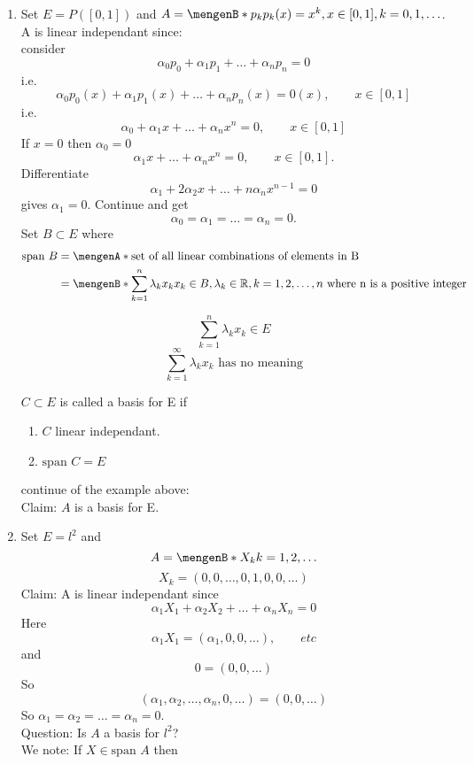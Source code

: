 	\begin{beispiele}
		\begin{enumerate}[(1)]
			\item 
		Set $E = P([0,1])$ and $A = \set[p_k]{p_k(x) = x^k, x \in [0,1], k= 0,1, \dots}$. A is linear independant since: \\ consider
		\[
			\alpha_0 p_0 + \alpha_1 p_1 + \dots + \alpha_np_n = 0
		\]
		i.e. 
		\[
			\alpha_0 p_0(x) + \alpha_1 p_1(x) + \dots + \alpha_n p_n(x) = 0(x), \qquad x \in [0,1] 
		\]
		i.e.
		\[
			\alpha_0 + \alpha_1 x + \dots + \alpha_n x^n = 0, \qquad x \in [0,1]
		\]
		If $x = 0$ then $\alpha_0 = 0$
		\[
			\alpha_1 x + \dots + \alpha_n x^n = 0, \qquad x \in [0,1].
		\]
		Differentiate
		\[
			\alpha_1 + 2 \alpha_2 x + \dots + n \alpha_n x^{n-1} = 0
		\]
		gives $\alpha_1 = 0$. Continue and get
		\[
			\alpha_0 = \alpha_1 = \dots = \alpha_n = 0.
		\]
		Set $B \subset E$ where
		\begin{align*}
			\text{span } B &= \set{\text{set of all linear combinations of elements in B}} \\
			&= \set[\sum_{k=1}^{n}\lambda_k x_k]{x_k \in B, \lambda_k \in \mathbb{R}, k=1,2,\dots,n \text{ where n is a positive integer}}
		\end{align*}
		\begin{bemerkung}
			\[
				\sum_{k=1}^{n}\lambda_k x_k \in E
			\]
			\[
				\sum_{k=1}^{\infty} \lambda_k x_k \text{    has no meaning}
			\]
		\end{bemerkung}
		$C \subset E$ is called a basis for E if
		\begin{enumerate}[1)]
			\item $C$ linear independant.
			\item $ \text{span } C = E$
		\end{enumerate}
		continue of the example above: \\
		Claim: $A$ is a basis for E.
		\item Set $E = l^2$ and
		\[
			A = \set[X_k]{k =1,2,\dots}
		\]
		\[
			X_k = (0,0,\dots,0,1,0,0,\dots)
		\]
		Claim: A is linear independant since
		\[
			\alpha_1 X_1 + \alpha_2 X_2 + \dots + \alpha_n X_n = 0
		\]
		Here 
		\[
			\alpha_1 X_1 = (\alpha_1,0,0,\dots), \qquad etc
		\]
		and
		\[
			0 = (0,0, \dots)
		\]
		So
		\[
			(\alpha_1,\alpha_2, \dots, \alpha_n,0, \dots) = (0,0,\dots)
		\]
		So $\alpha_1= \alpha_2 = \dots = \alpha_n = 0$. \\
		Question: Is $A$ a basis for $l^2$? \\
		We note: If $X \in \text{span }A$ then

\end{enumerate}
\end{beispiele}
